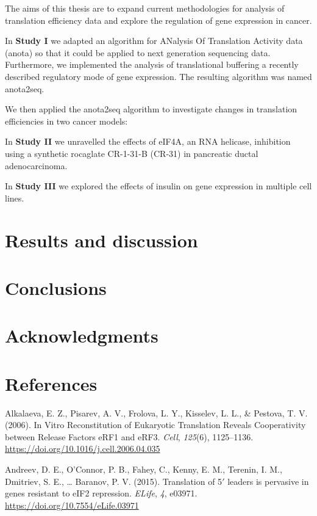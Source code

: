 \documentclass[12pt,openany]{book}
\begin{document}
The aims of this thesis are to expand current methodologies for analysis
of translation efficiency data and explore the regulation of gene
expression in cancer.

In \textbf{Study I} we adapted an algorithm for ANalysis Of Translation
Activity data (anota) so that it could be applied to next generation
sequencing data. Furthermore, we implemented the analysis of
translational buffering a recently described regulatory mode of gene
expression. The resulting algorithm was named anota2seq.

We then applied the anota2seq algorithm to investigate changes in
translation efficiencies in two cancer models:

In \textbf{Study II} we unravelled the effects of eIF4A, an RNA
helicase, inhibition using a synthetic rocaglate CR-1-31-B (CR-31) in
pancreatic ductal adenocarcinoma.

In \textbf{Study III} we explored the effects of insulin on gene
expression in multiple cell lines.

\chapter{Results and discussion}

\chapter{Conclusions}

\chapter*{Acknowledgments}\label{acknowledgments}

\chapter*{References}\label{references}

\hypertarget{refs}{}
\hypertarget{ref-Alkalaeva2006}{}
Alkalaeva, E. Z., Pisarev, A. V., Frolova, L. Y., Kisselev, L. L., \&
Pestova, T. V. (2006). In Vitro Reconstitution of Eukaryotic Translation
Reveals Cooperativity between Release Factors eRF1 and eRF3.
\emph{Cell}, \emph{125}(6), 1125--1136.
\url{https://doi.org/10.1016/j.cell.2006.04.035}

\hypertarget{ref-Andreev2015}{}
Andreev, D. E., O'Connor, P. B., Fahey, C., Kenny, E. M., Terenin, I.
M., Dmitriev, S. E., \ldots{} Baranov, P. V. (2015). Translation of
5\({'}\) leaders is pervasive in genes resistant to eIF2 repression.
\emph{ELife}, \emph{4}, e03971.
\url{https://doi.org/10.7554/eLife.03971}
\end{document}
